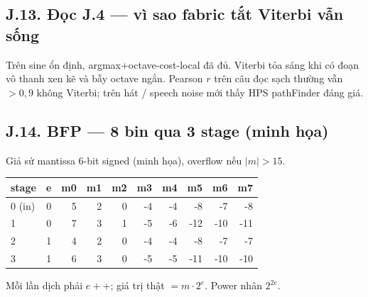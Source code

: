 \subsection*{J.13. Đọc J.4 --- vì sao fabric tắt Viterbi vẫn sống}
Trên sine ổn định, argmax+octave-cost-local đã đủ. Viterbi tỏa sáng khi có đoạn vô thanh xen kẽ và bẫy octave ngắn. Pearson $r$ trên câu đọc sạch thường vẫn $>0{,}9$ không Viterbi; trên hát / speech noise mới thấy HPS pathFinder đáng giá.

\subsection*{J.14. BFP --- 8 bin qua 3 stage (minh họa)}
Giả sử mantissa 6-bit signed (minh họa), overflow nếu $|m|>15$.
\begin{center}\scriptsize
\begin{tabular}{@{}lrrrrrrrrr@{}}
\toprule
stage & e & m0 & m1 & m2 & m3 & m4 & m5 & m6 & m7 \\
\midrule
0 (in) & 0 & 5 & 2 & 0 & -4 & -4 & -8 & -7 & -8 \\
1 & 0 & 7 & 3 & 1 & -5 & -6 & -12 & -10 & -11 \\
2 & 1 & 4 & 2 & 0 & -4 & -4 & -8 & -7 & -7 \\
3 & 1 & 6 & 3 & 0 & -5 & -5 & -11 & -10 & -10 \\
\bottomrule
\end{tabular}
\end{center}
Mỗi lần dịch phải $e{+}{+}$; giá trị thật $=m\cdot2^e$. Power nhân $2^{2e}$.

